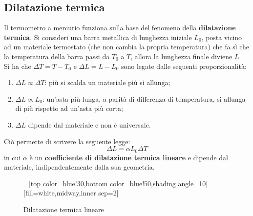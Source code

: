 \documentclass[a4paper]{extarticle}
\begin{document}
\subsection{Dilatazione termica}
Il termometro a mercurio funziona sulla base del fenomeno della \textbf{dilatazione termica}. Si consideri una barra metallica di lunghezza iniziale $L_0$, posta vicino ad un materiale termostato (che non cambia la propria temperatura) che fa sì che la temperatura della barra passi da $T_0$ a $T$, allora la lunghezza finale diviene $L$.\\
Si ha che $\Delta T=T-T_0$ e $\Delta L=L-L_0$ sono legate dalle seguenti proporzionalità:
\begin{enumerate}
  \item $\Delta L \propto \Delta T$: più si scalda un materiale più si allunga;
  \item $\Delta L \propto L_0$: un'asta più lunga, a parità di differenza di temperatura, si allunga di più rispetto ad un'asta più corta;
  \item $\Delta L$ dipende dal materiale e non è universale.
\end{enumerate}
Ciò permette di scrivere la seguente legge:
\[\boxed{\Delta L = \alpha L_0 \Delta T}\]
in cui $\alpha$ è un \textbf{coefficiente di dilatazione termica lineare} e dipende dal materiale, indipendentemente dalla sua geometria.

\begin{figure}[H]
  =[top color=blue!30,bottom color=blue!50,shading angle=10]
  =[fill=white,midway,inner sep=2]

  \centering
  \caption{Dilatazione termica lineare}
  \label{fig:dilatazione_termica_lineare}
\end{figure}
\end{document}
